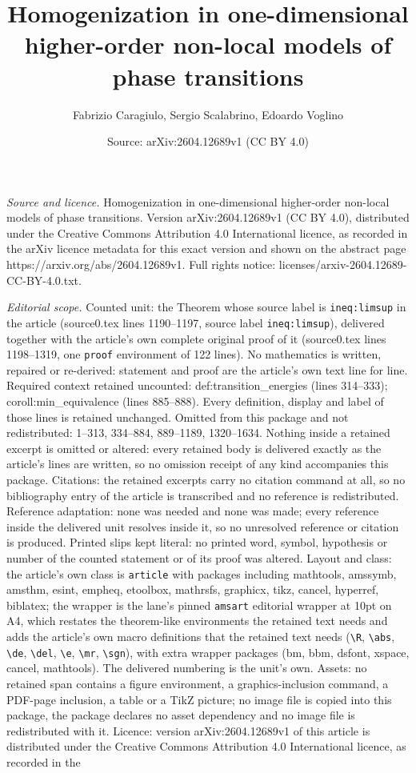 \documentclass[10pt,a4paper]{amsart}
\title[Homogenization in one-dimensional higher-order non-local mod]{Homogenization in one-dimensional higher-order non-local models of phase transitions}
\author{Fabrizio Caragiulo, Sergio Scalabrino, Edoardo Voglino}
\date{Source: arXiv:2604.12689v1 (CC BY 4.0)}
\begin{document}
\maketitle

\noindent\emph{Source and licence.} Homogenization in one-dimensional higher-order non-local models of phase transitions. Version arXiv:2604.12689v1 (CC BY 4.0), distributed under the Creative Commons Attribution 4.0 International licence, as recorded in the arXiv licence metadata for this exact version and shown on the abstract page https://arxiv.org/abs/2604.12689v1. Full rights notice: licenses/arxiv-2604.12689-CC-BY-4.0.txt.\par\smallskip

\noindent\textit{Editorial scope.} Counted unit: the Theorem whose source label is \texttt{ineq:limsup} in the article (source0.tex lines 1190--1197, source label \texttt{ineq:limsup}), delivered together with the article's own complete original proof of it (source0.tex lines 1198--1319, one \texttt{proof} environment of 122 lines). No mathematics is written, repaired or re-derived: statement and proof are the article's own text line for line. Required context retained uncounted: def:transition\_energies (lines 314--333); coroll:min\_equivalence (lines 885--888). Every definition, display and label of those lines is retained unchanged. Omitted from this package and not redistributed: 1--313, 334--884, 889--1189, 1320--1634. Nothing inside a retained excerpt is omitted or altered: every retained body is delivered exactly as the article's lines are written, so no omission receipt of any kind accompanies this package. Citations: the retained excerpts carry no citation command at all, so no bibliography entry of the article is transcribed and no reference is redistributed. Reference adaptation: none was needed and none was made; every reference inside the delivered unit resolves inside it, so no unresolved reference or citation is produced. Printed slips kept literal: no printed word, symbol, hypothesis or number of the counted statement or of its proof was altered. Layout and class: the article's own class is \texttt{article} with packages including mathtools, amssymb, amsthm, esint, empheq, etoolbox, mathrsfs, graphicx, tikz, cancel, hyperref, biblatex; the wrapper is the lane's pinned \texttt{amsart} editorial wrapper at 10pt on A4, which restates the theorem-like environments the retained text needs and adds the article's own macro definitions that the retained text needs (\texttt{\textbackslash R}, \texttt{\textbackslash abs}, \texttt{\textbackslash de}, \texttt{\textbackslash del}, \texttt{\textbackslash e}, \texttt{\textbackslash mr}, \texttt{\textbackslash sgn}), with extra wrapper packages (bm, bbm, dsfont, xspace, cancel, mathtools). The delivered numbering is the unit's own. Assets: no retained span contains a figure environment, a graphics-inclusion command, a PDF-page inclusion, a table or a TikZ picture; no image file is copied into this package, the package declares no asset dependency and no image file is redistributed with it. Licence: version arXiv:2604.12689v1 of this article is distributed under the Creative Commons Attribution 4.0 International licence, as recorded in the 
\end{document}
